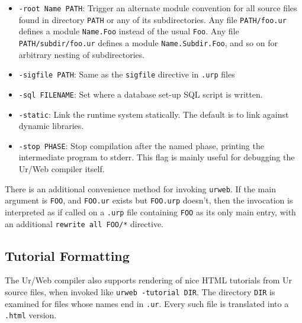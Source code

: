 \documentclass{article}
\newcommand{\cd}[1]{\texttt{#1}}
\begin{document}
\begin{itemize}
\item \texttt{-root Name PATH}: Trigger an alternate module convention for all source files found in directory \texttt{PATH} or any of its subdirectories.  Any file \texttt{PATH/foo.ur} defines a module \texttt{Name.Foo} instead of the usual \texttt{Foo}.  Any file \texttt{PATH/subdir/foo.ur} defines a module \texttt{Name.Subdir.Foo}, and so on for arbitrary nesting of subdirectories.

\item \texttt{-sigfile PATH}: Same as the \texttt{sigfile} directive in \texttt{.urp} files

\item \texttt{-sql FILENAME}: Set where a database set-up SQL script is written.

\item \texttt{-static}: Link the runtime system statically.  The default is to link against dynamic libraries.

\item \texttt{-stop PHASE}: Stop compilation after the named phase, printing the intermediate program to stderr.  This flag is mainly useful for debugging the Ur/Web compiler itself.
\end{itemize}

There is an additional convenience method for invoking \texttt{urweb}.  If the main argument is \texttt{FOO}, and \texttt{FOO.ur} exists but \texttt{FOO.urp} doesn't, then the invocation is interpreted as if called on a \texttt{.urp} file containing \texttt{FOO} as its only main entry, with an additional \texttt{rewrite all FOO/*} directive.

\subsection{Tutorial Formatting}

The Ur/Web compiler also supports rendering of nice HTML tutorials from Ur source files, when invoked like \cd{urweb -tutorial DIR}.  The directory \cd{DIR} is examined for files whose names end in \cd{.ur}.  Every such file is translated into a \cd{.html} version.
\end{document}
